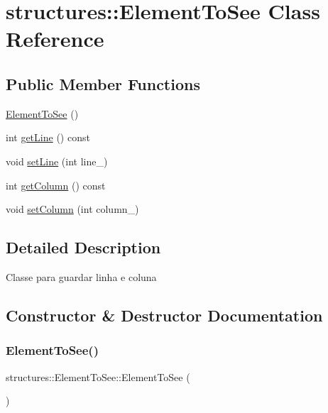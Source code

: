 \hypertarget{classstructures_1_1ElementToSee}{}\section{structures\+:\+:Element\+To\+See Class Reference}
\label{classstructures_1_1ElementToSee}
\subsection*{Public Member Functions}
\begin{DoxyCompactItemize}
\item 
\hyperlink{classstructures_1_1ElementToSee_ac6c9282638a3a9ade98113f569a3615f}{Element\+To\+See} ()
\item 
int \hyperlink{classstructures_1_1ElementToSee_afcdb04e03dc9150c04c8647119d7dbde}{get\+Line} () const
\item 
void \hyperlink{classstructures_1_1ElementToSee_a560a8217529d80a231f5c2da9b090d2b}{set\+Line} (int line\+\_\+)
\item 
int \hyperlink{classstructures_1_1ElementToSee_a3a79c7c2d59cea83ace1c626574326a4}{get\+Column} () const
\item 
void \hyperlink{classstructures_1_1ElementToSee_ab9f69c1102ab17dc607e4995cd2a6227}{set\+Column} (int column\+\_\+)
\end{DoxyCompactItemize}


\subsection{Detailed Description}
Classe para guardar linha e coluna 

\subsection{Constructor \& Destructor Documentation}
\mbox{\label{classstructures_1_1ElementToSee_ac6c9282638a3a9ade98113f569a3615f}} 
\subsubsection{\texorpdfstring{Element\+To\+See()}{ElementToSee()}}
{\footnotesize\ttfamily structures\+::\+Element\+To\+See\+::\+Element\+To\+See (\begin{DoxyParamCaption}{ }\end{DoxyParamCaption})}


